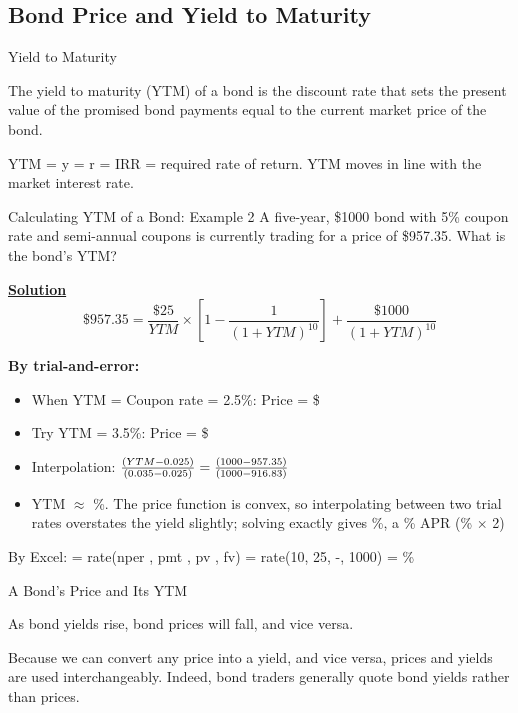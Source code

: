 \documentclass[9pt,aspectratio=169]{beamer}
\newcommand{\keypoint}[1]{%
  \par\noindent
  \begingroup
  \usebeamercolor{keypoint}%
  \setlength{\fboxsep}{7pt}%
  \colorbox{bg}{\parbox{\dimexpr\linewidth-2\fboxsep\relax}{\color{fg}#1}}%
  \endgroup
  \par\medskip}
\begin{document}
\subsection{Bond Price and Yield to Maturity}
\begin{frame}{Yield to Maturity}
\keypoint{The yield to maturity (YTM) of a bond is the discount rate that sets the present
value of the promised bond payments equal to the current market price of the bond.}

YTM = y = r = IRR = required rate of return. YTM moves in line with the market interest
rate.
\end{frame}


\begin{frame}{Calculating YTM of a Bond: Example 2}
A five-year, \$1000 bond with 5\% coupon rate and semi-annual coupons is currently trading for a price of \$957.35. What is the bond's YTM?

\textbf{\underline{Solution}}
$$\$957.35 = \frac{\$25}{YTM} \times \left[1 - \frac{1}{(1 + YTM)^{10}}\right] + \frac{\$1000}{(1 + YTM)^{10}}$$

\textbf{By trial-and-error:}
\begin{itemize}
\item When YTM = Coupon rate = 2.5\%: Price = \$\LExTwoAtCoupon
\item Try YTM = 3.5\%: Price = \$\LExTwoAtHigh
\item Interpolation: $\frac{(YTM - 0.025)}{(0.035-0.025)} = \frac{(1000 - 957.35)}{(1000 - 916.83)}$
\item YTM $\approx$ \LExTwoYTM\%. The price function is convex, so interpolating between two trial rates overstates the yield slightly; solving exactly gives \LExTwoSemi\%, a \LExTwoAPR\% APR (\LExTwoSemi\% $\times$ 2)
\end{itemize}

By Excel: = rate(nper , pmt , pv , fv) = rate(10, 25, -\LExTwoPrice, 1000) = \LExTwoSemi\%
\end{frame}


\begin{frame}{A Bond's Price and Its YTM}
\keypoint{As bond yields rise, bond prices will fall, and vice versa.}

Because we can convert any price into a yield, and vice versa, prices and yields are used
interchangeably. Indeed, bond traders generally quote bond yields rather than prices.
\end{frame}
\end{document}
